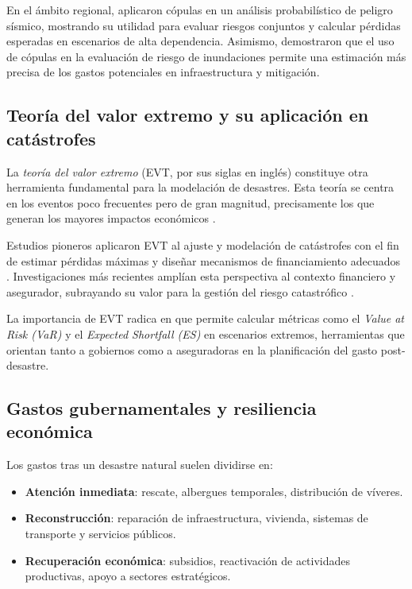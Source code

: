\documentclass[12pt, a4paper]{article}
\begin{document}
En el ámbito regional, \cite{RiveraVargas2022} aplicaron cópulas en un análisis probabilístico de peligro sísmico, mostrando su utilidad para evaluar riesgos conjuntos y calcular pérdidas esperadas en escenarios de alta dependencia. Asimismo, \cite{Chand2024} demostraron que el uso de cópulas en la evaluación de riesgo de inundaciones permite una estimación más precisa de los gastos potenciales en infraestructura y mitigación.  

\subsection*{Teoría del valor extremo y su aplicación en catástrofes}
La \textit{teoría del valor extremo} (EVT, por sus siglas en inglés) constituye otra herramienta fundamental para la modelación de desastres. Esta teoría se centra en los eventos poco frecuentes pero de gran magnitud, precisamente los que generan los mayores impactos económicos \cite{Siddiqui2022}.  

Estudios pioneros aplicaron EVT al ajuste y modelación de catástrofes con el fin de estimar pérdidas máximas y diseñar mecanismos de financiamiento adecuados \cite{PerezGarcia2004}. Investigaciones más recientes amplían esta perspectiva al contexto financiero y asegurador, subrayando su valor para la gestión del riesgo catastrófico \cite{DelfinerGutierrez2025}.  

La importancia de EVT radica en que permite calcular métricas como el \textit{Value at Risk (VaR)} y el \textit{Expected Shortfall (ES)} en escenarios extremos, herramientas que orientan tanto a gobiernos como a aseguradoras en la planificación del gasto post-desastre.  

\subsection*{Gastos gubernamentales y resiliencia económica}
Los gastos tras un desastre natural suelen dividirse en:  
\begin{itemize}
    \item \textbf{Atención inmediata}: rescate, albergues temporales, distribución de víveres.  
    \item \textbf{Reconstrucción}: reparación de infraestructura, vivienda, sistemas de transporte y servicios públicos.  
    \item \textbf{Recuperación económica}: subsidios, reactivación de actividades productivas, apoyo a sectores estratégicos.  
\end{itemize}  
\end{document}
